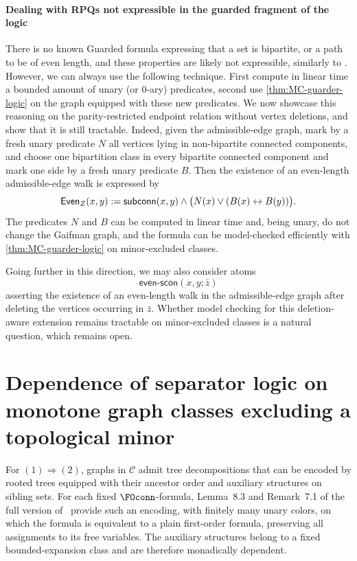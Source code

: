 \documentclass[1p,number,11pt]{elsarticle}
\newcommand{\scon}{\hbox{\sf subconn}}
\newcommand{\GFOscon}{\textup{Guarded}\raisebox{0.4pt}{\texttt{-}}\FOscon}
\theoremstyle{plain}
\newcommand{\Cc}{\mathscr{C}}
\begin{document}
\paragraph{Dealing with RPQs not expressible in the guarded fragment of the logic}

There is no known \GFOscon\xspace formula expressing that a set is bipartite, or a path to be of even length, and these properties are likely not expressible, similarly to \FOconn\xspace \cite[Theorem 3.12]{schirrmacher2023first}.
However, we can always use the following technique. First compute in linear time a bounded amount of unary (or 0-ary) predicates, second use \cref{thm:MC-guarder-logic} on the graph equipped with these new predicates. We now showcase this reasoning on 
the parity-restricted endpoint relation without vertex deletions, and show that it is still
tractable. Indeed, given the admissible-edge graph, mark by a fresh unary
predicate $N$ all vertices lying in non-bipartite connected components, and
choose one bipartition class in every bipartite connected component and mark
one side by a fresh unary predicate $B$. Then the existence of an even-length
admissible-edge walk is expressed by
\[
  \mathsf{Even}_Z(x,y):=
  \scon(x,y)\wedge
  \bigl(N(x)\vee(B(x)\leftrightarrow B(y))\bigr).
\]
The predicates $N$ and $B$ can be computed in linear time and, being unary,
do not change the Gaifman graph, and the formula can be model-checked efficiently with \cref{thm:MC-guarder-logic} on minor-excluded classes. 

Going further in this direction, we may also consider atoms
\[
  \mathsf{even\text{-}scon}(x,y;\bar z)
\]
asserting the existence of an even-length walk in the admissible-edge graph
after deleting the vertices occurring in $\bar z$. Whether model checking for
this deletion-aware extension remains tractable on minor-excluded classes is
a natural question, which remains open.


\clearpage
\appendix

\section{Dependence of separator logic on monotone graph classes excluding a topological minor}
\label{app:separator-characterization}


For $(1)\Rightarrow(2)$, graphs in $\Cc$ admit tree decompositions that can be encoded by rooted trees equipped with their ancestor order and auxiliary structures on sibling sets. For each fixed $\FOconn$-formula, Lemma~8.3 and Remark~7.1 of the full version of~\cite{pillipczuk2021connectivity} provide such an encoding, with finitely many unary colors, on which the formula is equivalent to a plain first-order formula, preserving all assignments to its free variables. The auxiliary structures belong to a fixed bounded-expansion class and are therefore monadically dependent.
\end{document}
